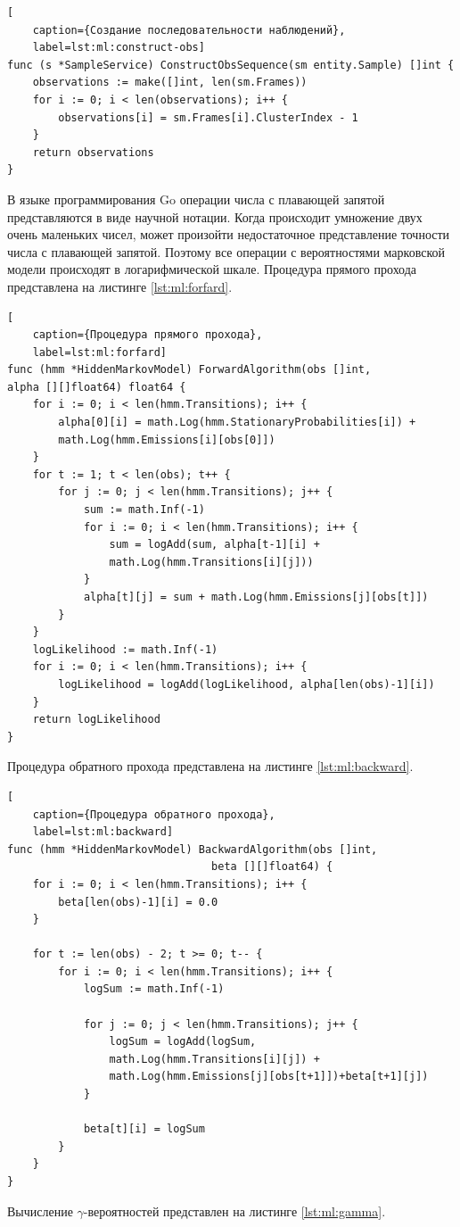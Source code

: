\begin{lstlisting}[
	caption={Создание последовательности наблюдений},
	label=lst:ml:construct-obs]
func (s *SampleService) ConstructObsSequence(sm entity.Sample) []int {
	observations := make([]int, len(sm.Frames))
	for i := 0; i < len(observations); i++ {
		observations[i] = sm.Frames[i].ClusterIndex - 1
	}
	return observations
}
\end{lstlisting}
В языке программирования Go операции числа с плавающей запятой представляются в виде научной нотации. Когда происходит умножение двух очень маленьких чисел, может произойти недостаточное представление точности числа с плавающей запятой. Поэтому все операции с вероятностями марковской модели происходят в логарифмической шкале.
Процедура прямого прохода  представлена на листинге \ref{lst:ml:forfard}.
\begin{lstlisting}[
	caption={Процедура прямого прохода},
	label=lst:ml:forfard]
func (hmm *HiddenMarkovModel) ForwardAlgorithm(obs []int,
alpha [][]float64) float64 {
	for i := 0; i < len(hmm.Transitions); i++ {
		alpha[0][i] = math.Log(hmm.StationaryProbabilities[i]) +
		math.Log(hmm.Emissions[i][obs[0]])
	}
	for t := 1; t < len(obs); t++ {
		for j := 0; j < len(hmm.Transitions); j++ {
			sum := math.Inf(-1)
			for i := 0; i < len(hmm.Transitions); i++ {
				sum = logAdd(sum, alpha[t-1][i] + 
				math.Log(hmm.Transitions[i][j]))
			}
			alpha[t][j] = sum + math.Log(hmm.Emissions[j][obs[t]])
		}
	}
	logLikelihood := math.Inf(-1)
	for i := 0; i < len(hmm.Transitions); i++ {
		logLikelihood = logAdd(logLikelihood, alpha[len(obs)-1][i])
	}
	return logLikelihood
}
\end{lstlisting}
Процедура обратного прохода представлена на листинге \ref{lst:ml:backward}. 
\begin{lstlisting}[
	caption={Процедура обратного прохода},
	label=lst:ml:backward]
func (hmm *HiddenMarkovModel) BackwardAlgorithm(obs []int, 
								beta [][]float64) {
	for i := 0; i < len(hmm.Transitions); i++ {
		beta[len(obs)-1][i] = 0.0
	}
	
	for t := len(obs) - 2; t >= 0; t-- {
		for i := 0; i < len(hmm.Transitions); i++ {
			logSum := math.Inf(-1)
			
			for j := 0; j < len(hmm.Transitions); j++ {
				logSum = logAdd(logSum,
				math.Log(hmm.Transitions[i][j]) + 
				math.Log(hmm.Emissions[j][obs[t+1]])+beta[t+1][j])
			}
			
			beta[t][i] = logSum
		}
	}
}
\end{lstlisting}
Вычисление $\gamma$-вероятностей представлен на листинге \ref{lst:ml:gamma}.
